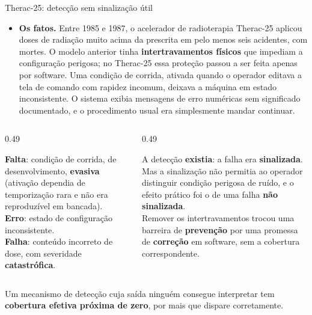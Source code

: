 \documentclass{beamer}
\begin{document}
\begin{frame}{Therac-25: detec\c{c}\~ao sem sinaliza\c{c}\~ao \'util}
    \footnotesize
    \begin{itemize}
        \item \textbf{Os fatos.} Entre 1985 e 1987, o acelerador de radioterapia Therac-25 aplicou doses de radia\c{c}\~ao muito acima da prescrita em pelo menos seis acidentes, com mortes. O modelo anterior tinha \textbf{intertravamentos f\'isicos} que impediam a configura\c{c}\~ao perigosa; no Therac-25 essa prote\c{c}\~ao passou a ser feita apenas por software. Uma condi\c{c}\~ao de corrida, ativada quando o operador editava a tela de comando com rapidez incomum, deixava a m\'aquina em estado inconsistente. O sistema exibia mensagens de erro num\'ericas sem significado documentado, e o procedimento usual era simplesmente mandar continuar.
    \end{itemize}
    \medskip
    \begin{columns}[T]
        \begin{column}{0.49\textwidth}
            \begin{tcolorbox}[colback=depVermelho!5,colframe=depVermelho!65,boxrule=0.6pt,title={\scriptsize\bfseries A cadeia}]
                \scriptsize
                \textbf{Falta}: condi\c{c}\~ao de corrida, de desenvolvimento, \textbf{evasiva} (ativa\c{c}\~ao dependia de temporiza\c{c}\~ao rara e n\~ao era reproduz\'ivel em bancada).\\
                \textbf{Erro}: estado de configura\c{c}\~ao inconsistente.\\
                \textbf{Falha}: conte\'udo incorreto de dose, com severidade \textbf{catastr\'ofica}.
            \end{tcolorbox}
        \end{column}
        \begin{column}{0.49\textwidth}
            \begin{tcolorbox}[colback=depLaranja!8,colframe=depLaranja!70,boxrule=0.6pt,title={\scriptsize\bfseries O que a taxonomia expõe}]
                \scriptsize
                A detec\c{c}\~ao \textbf{existia}: a falha era \textbf{sinalizada}. Mas a sinaliza\c{c}\~ao n\~ao permitia ao operador distinguir condi\c{c}\~ao perigosa de ru\'ido, e o efeito pr\'atico foi o de uma falha \textbf{n\~ao sinalizada}.\\
                Remover os intertravamentos trocou uma barreira de \textbf{preven\c{c}\~ao} por uma promessa de \textbf{corre\c{c}\~ao} em software, sem a cobertura correspondente.
            \end{tcolorbox}
        \end{column}
    \end{columns}
    \medskip
    \begin{ancora}
        \footnotesize
        Um mecanismo de detec\c{c}\~ao cuja sa\'ida ningu\'em consegue interpretar tem \textbf{cobertura efetiva pr\'oxima de zero}, por mais que dispare corretamente.
    \end{ancora}
\end{frame}
\end{document}
